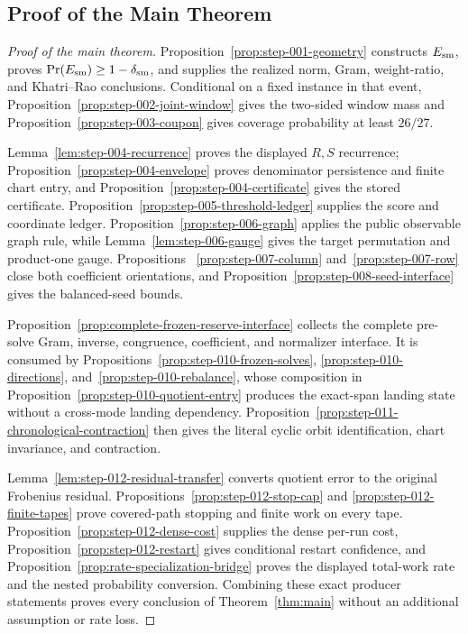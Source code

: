 \subsection{Proof of the Main Theorem}\label{app:main-proof}
\begin{proof}[Proof of the main theorem]
Proposition~\ref{prop:step-001-geometry} constructs $E_{\rm sm}$, proves
$\Pr(E_{\rm sm})\ge1-\delta_{\rm sm}$, and supplies the realized norm, Gram,
weight-ratio, and Khatri--Rao conclusions. Conditional on a fixed instance in
that event, Proposition~\ref{prop:step-002-joint-window} gives the two-sided
window mass and Proposition~\ref{prop:step-003-coupon} gives coverage
probability at least $26/27$.

Lemma~\ref{lem:step-004-recurrence} proves the displayed $R,S$ recurrence;
Proposition~\ref{prop:step-004-envelope} proves denominator persistence and
finite chart entry, and Proposition~\ref{prop:step-004-certificate} gives the
stored certificate. Proposition~\ref{prop:step-005-threshold-ledger} supplies
the score and coordinate ledger. Proposition~\ref{prop:step-006-graph} applies
the public observable graph rule, while Lemma~\ref{lem:step-006-gauge} gives
the target permutation and product-one gauge. Propositions~
\ref{prop:step-007-column} and~\ref{prop:step-007-row} close both coefficient
orientations, and Proposition~\ref{prop:step-008-seed-interface} gives the
balanced-seed bounds.

Proposition~\ref{prop:complete-frozen-reserve-interface} collects the complete
pre-solve Gram, inverse, congruence, coefficient, and normalizer interface.
It is consumed by Propositions~\ref{prop:step-010-frozen-solves},
\ref{prop:step-010-directions}, and~\ref{prop:step-010-rebalance}, whose
composition in Proposition~\ref{prop:step-010-quotient-entry} produces the
exact-span landing state without a cross-mode landing dependency.
Proposition~\ref{prop:step-011-chronological-contraction} then gives the
literal cyclic orbit identification, chart invariance, and contraction.

Lemma~\ref{lem:step-012-residual-transfer} converts quotient error to the
original Frobenius residual. Propositions~\ref{prop:step-012-stop-cap} and
\ref{prop:step-012-finite-tapes} prove covered-path stopping and finite work on
every tape. Proposition~\ref{prop:step-012-dense-cost} supplies the dense
per-run cost, Proposition~\ref{prop:step-012-restart} gives conditional
restart confidence, and Proposition~\ref{prop:rate-specialization-bridge}
proves the displayed total-work rate and the nested probability conversion.
Combining these exact producer statements proves every conclusion of
Theorem~\ref{thm:main} without an additional assumption or rate loss.
\end{proof}
